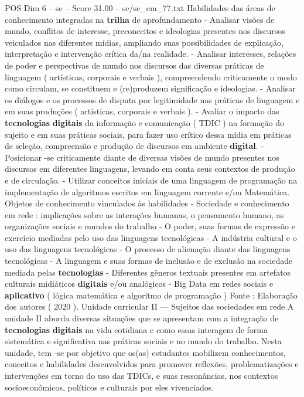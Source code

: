\begin{textsample}{POS Dim 6 – sc – Score 31.00 – sc/sc\_em\_77.txt}
Habilidades das áreas de conhecimento integradas na \textbf{trilha} de aprofundamento - Analisar visões de mundo, conflitos de interesse, preconceitos e ideologias presentes nos discursos veiculados nas diferentes mídias, ampliando suas possibilidades de explicação, interpretação e intervenção crítica da/na realidade. - Analisar interesses, relações de poder e perspectivas de mundo nos discursos das diversas práticas de linguagem ( artísticas, corporais e verbais ), compreendendo criticamente o modo como circulam, se constituem e (re)produzem significação e ideologias. - Analisar os diálogos e os processos de disputa por legitimidade nas práticas de linguagem e em suas produções ( artísticas, corporais e verbais ). - Avaliar o impacto das \textbf{tecnologias} \textbf{digitais} da informação e comunicação ( TDIC ) na formação do sujeito e em suas práticas sociais, para fazer uso crítico dessa mídia em práticas de seleção, compreensão e produção de discursos em ambiente \textbf{digital}. - Posicionar -se criticamente diante de diversas visões de mundo presentes nos discursos em diferentes linguagens, levando em conta seus contextos de produção e de circulação. - Utilizar conceitos iniciais de uma linguagem de programação na implementação de algoritmos escritos em linguagem corrente e/ou Matemática.
Objetos de conhecimento vinculados às habilidades - Sociedade e conhecimento em rede : implicações sobre as interações humanas, o pensamento humano, as organizações sociais e mundos do trabalho - O poder, suas formas de expressão e exercício mediadas pelo uso das linguagens tecnológicas - A indústria cultural e o uso das linguagens tecnológicas - O processo de alienação diante das linguagens tecnológicas - A linguagem e suas formas de inclusão e de exclusão na sociedade mediada pelas \textbf{tecnologias} - Diferentes gêneros textuais presentes em artefatos culturais midiáticos \textbf{digitais} e/ou analógicos - Big Data em redes sociais e \textbf{aplicativo} ( lógica matemática e algoritmo de programação ) Fonte : Elaboração dos autores ( 2020 ).
Unidade curricular II — Sujeitos das sociedades em rede A unidade II aborda diversas situações que se apresentam com a integração de \textbf{tecnologias} \textbf{digitais} na vida cotidiana e como essas interagem de forma sistemática e significativa nas práticas sociais e no mundo do trabalho.
Nesta unidade, tem -se por objetivo que os(as) estudantes mobilizem conhecimentos, conceitos e habilidades desenvolvidos para promover reflexões, problematizações e intervenções em torno do uso das TDICs, e suas ressonâncias, nos contextos socioeconômicos, políticos e culturais por eles vivenciados.

\end{textsample}
